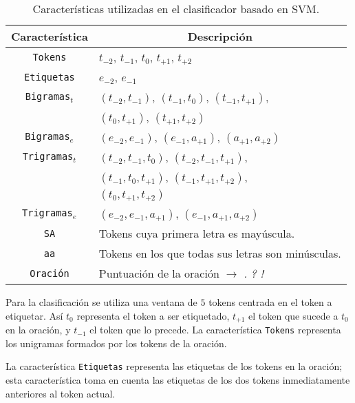 \documentclass[runningheads,a4paper]{llncs}
\begin{document}
\begin{table}[ht]
 	\renewcommand{\arraystretch}{1.3}
	\renewcommand{\tabcolsep}{3pt}
	\caption{Características utilizadas en el clasificador basado en SVM.}
	\label{table:featuresSVM}
	\centering
	\begin{tabular}{c l}
		\hline\hline
		\multicolumn{1}{c}{\textbf{Característica}} & \multicolumn{1}{c}{\textbf{Descripción}} \\
		\hline
		\texttt{Tokens} & $t_{-2}$, $t_{-1}$, $t_{0}$, $t_{+1}$, $t_{+2}$ \\
		\texttt{Etiquetas} &  $e_{-2}$, $e_{-1}$ \\
		\texttt{Bigramas$_{t}$} & $(t_{-2},t_{-1})$, $(t_{-1},t_{0})$, $(t_{-1},t_{+1})$, \\
			& $(t_{0},t_{+1})$, $(t_{+1},t_{+2})$ \\
		\texttt{Bigramas$_{e}$} & $(e_{-2},e_{-1})$, $(e_{-1},a_{+1})$, $(a_{+1},a_{+2})$ \\
		\texttt{Trigramas$_{t}$} & $(t_{-2},t_{-1},t_{0})$, $(t_{-2},t_{-1},t_{+1})$, \\
			& $(t_{-1},t_{0},t_{+1})$, $(t_{-1},t_{+1},t_{+2})$, \\
			& $(t_{0},t_{+1},t_{+2})$ \\
		\texttt{Trigramas$_{e}$} & $(e_{-2},e_{-1},a_{+1})$, $(e_{-1},a_{+1},a_{+2})$ \\
		\texttt{SA} & Tokens cuya primera letra es mayúscula. \\
		\texttt{aa} & Tokens en los que todas sus letras son minúsculas. \\
		\texttt{Oraci\'on} & Puntuación de la oración $\rightarrow$ \emph{.} \emph{?} \emph{!} \\
		\hline
	\end{tabular}
\end{table}

Para la clasificación se utiliza una ventana de $5$ tokens centrada en el token a etiquetar. Así $t_{0}$ representa el token a ser etiquetado, $t_{+1}$ el token que sucede a $t_{0}$ en la oración, y $t_{-1}$ el token que lo precede. La característica \texttt{\small Tokens} representa los unigramas formados por los tokens de la oración. 

La característica \texttt{\small Etiquetas} representa las etiquetas de los tokens en la oración; esta característica toma en cuenta las etiquetas de los dos tokens inmediatamente anteriores al token actual.
\end{document}
